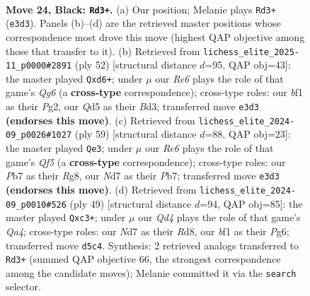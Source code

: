 \documentclass[11pt]{article}
\begin{document}
\clearpage

\begin{figure}[p]\centering
\begin{subfigure}{0.46\textwidth}\centering
\resizebox{\linewidth}{!}{%
\newchessgame
\chessboard[
  setfen={Q7/pp1n2kp/7p/1P1q2b1/3P2P1/4rP2/4N3/R2K1B1R b - - 0 24},
  showmover=false,
  pgfstyle=straightmove, color=movearrow, markmove={e3-d3}
]}
\caption{}
\end{subfigure}\hfill
\begin{subfigure}{0.46\textwidth}\centering
\resizebox{\linewidth}{!}{%
\newchessgame
\chessboard[
  setfen={1r3kr1/8/2pp2Qp/pp5P/P3P3/3Bp3/q1PN2P1/6K1 w - - 1 27},
  showmover=false,
  pgfstyle=straightmove, color=movearrow, markmove={g6-d6}
]}
\caption{}
\end{subfigure}
\\[4pt]
\begin{subfigure}{0.46\textwidth}\centering
\resizebox{\linewidth}{!}{%
\newchessgame
\chessboard[
  setfen={2k3r1/1p6/p1b4p/2P2p1Q/P4q1P/2P5/5RP1/R5K1 b - - 0 30},
  showmover=false,
  pgfstyle=straightmove, color=movearrow, markmove={f4-e3}
]}
\caption{}
\end{subfigure}\hfill
\begin{subfigure}{0.46\textwidth}\centering
\resizebox{\linewidth}{!}{%
\newchessgame
\chessboard[
  setfen={3r1bk1/pQ5p/4p1p1/q3B3/P2P2P1/2PB4/5P2/R3K3 b Q - 0 25},
  showmover=false,
  pgfstyle=straightmove, color=movearrow, markmove={a5-c3}
]}
\caption{}
\end{subfigure}
\caption{\textbf{Move 24, Black: \texttt{Rd3+}.} (a) Our position; Melanie plays \texttt{Rd3+} (\texttt{e3d3}). Panels (b)--(d) are the retrieved master positions whose correspondence most drove this move (highest QAP objective among those that transfer to it). (b) Retrieved from \texttt{lichess\_elite\_2025-11\_p0000\#2891} (ply 52) [structural distance $d$=95, QAP obj=43]: the master played \texttt{Qxd6+}; under $\mu$ our \emph{Re6} plays the role of that game's \emph{Qg6} (a \textbf{cross-type} correspondence); cross-type roles: our \emph{b}f1 as their \emph{P}g2, our \emph{Q}d5 as their \emph{B}d3; transferred move \texttt{e3d3} \textbf{(endorses this move)}. (c) Retrieved from \texttt{lichess\_elite\_2024-09\_p0026\#1027} (ply 59) [structural distance $d$=88, QAP obj=23]: the master played \texttt{Qe3}; under $\mu$ our \emph{Re6} plays the role of that game's \emph{Qf5} (a \textbf{cross-type} correspondence); cross-type roles: our \emph{P}b7 as their \emph{R}g8, our \emph{N}d7 as their \emph{P}b7; transferred move \texttt{e3d3} \textbf{(endorses this move)}. (d) Retrieved from \texttt{lichess\_elite\_2024-09\_p0010\#526} (ply 49) [structural distance $d$=94, QAP obj=85]: the master played \texttt{Qxc3+}; under $\mu$ our \emph{Qd4} plays the role of that game's \emph{Qa4}; cross-type roles: our \emph{N}d7 as their \emph{R}d8, our \emph{b}f1 as their \emph{P}g6; transferred move \texttt{d5c4}. Synthesis: 2 retrieved analogs transferred to \texttt{Rd3+} (summed QAP objective 66, the strongest correspondence among the candidate moves); Melanie committed it via the \texttt{search} selector.}
\label{fig:thought-m47}
\end{figure}
\end{document}
